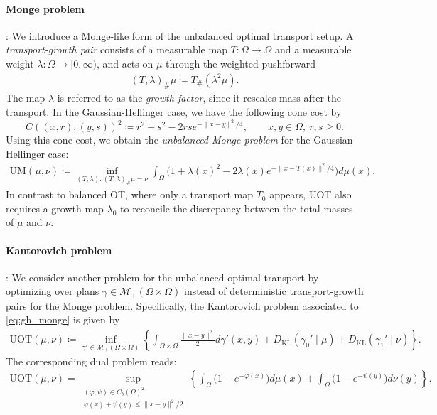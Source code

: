 \documentclass[11pt,reqno]{amsart}
\theoremstyle{definition}
\newcommand{\KL}{\mathrm{KL}}
\newcommand{\mM}{\mathcal{M}}
\begin{document}
\paragraph{Monge problem}: We introduce a Monge-like form of the unbalanced optimal transport setup.
A \textit{transport-growth pair} consists of a measurable map $T:\Omega\to\Omega$ and a measurable weight $\lambda:\Omega\to[0,\infty)$, and acts on $\mu$ through the weighted pushforward
\begin{align}
    (T,\lambda)_{\#}\mu \coloneqq T_{\#}(\lambda^2\mu).
\end{align}
The map $\lambda$ is referred to as the \emph{growth factor}, since it rescales mass after the transport.
In the {Gaussian-Hellinger} case, we have the following cone cost by 
$$
    C((x,r),(y,s))^2
    \coloneqq
    r^2 + s^2 - 2rs e^{-\|x-y\|^2/4}
    ,\qquad x,y\in\Omega,\ r,s\ge 0.
$$
Using this cone cost, we obtain the 
\emph{unbalanced Monge problem} for the Gaussian-Hellinger case:
\begin{align}
\label{eq:gh_monge}
    \mathrm{UM}(\mu,\nu)
    \coloneqq
    \inf_{(T,\lambda): (T,\lambda)_{\#}\mu=\nu}
    \int_\Omega
    \bigl(
        1 + \lambda(x)^2 - 2\lambda(x) e^{-\|x-T(x)\|^2/4}
    \bigr) d\mu(x).
\end{align}
In contrast to balanced OT, where only a transport map $T_0$ appears, UOT also requires a growth map $\lambda_0$ to reconcile the discrepancy between the total masses of $\mu$ and $\nu$.


\paragraph{Kantorovich problem}: We consider another problem for the unbalanced optimal transport by optimizing over plans $\gamma\in\mM_+(\Omega\times\Omega)$ instead of deterministic transport-growth pairs for the Monge problem. Specifically, the Kantorovich problem associated to \eqref{eq:gh_monge} is given by
\begin{align}
\label{eq:gh_kantorovich}
    \mathrm{UOT}(\mu,\nu)
    \coloneqq
    \inf_{\gamma'\in\mM_+(\Omega\times\Omega)}
    \left\{
        \int_{\Omega\times\Omega} \frac{\|x-y\|^2}{2} d\gamma'(x,y)
        + D_\KL(\gamma_0'\mid\mu)
        + D_\KL(\gamma_1'\mid\nu)
    \right\}.
\end{align}
The corresponding dual problem reads:
\begin{align}
\label{eq:gh_dual}
    \mathrm{UOT}(\mu,\nu)
    =
    \sup_{\substack{(\varphi,\psi)\in C_b(\Omega)^2\\ \varphi(x)+\psi(y)\le \|x-y\|^2/2}}
    \left\{
        \int_\Omega \bigl(1-e^{-\varphi(x)}\bigr) d\mu(x)
        + \int_\Omega \bigl(1-e^{-\psi(y)}\bigr) d\nu(y)
    \right\}.
\end{align}
\end{document}
